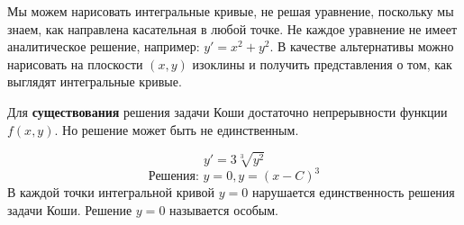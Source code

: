   \begin{ntc}
  Мы можем нарисовать интегральные кривые, не решая уравнение, поскольку мы знаем, как направлена касательная в любой точке.
  Не каждое уравнение не имеет аналитическое решение, например: $ y' = x^2 + y^2 $. В качестве альтернативы можно нарисовать на плоскости $(x, y)$ изоклины и получить представления о том, как выглядят интегральные кривые.
  \end{ntc}
  
  \begin{ntc}
  Для \textbf{существования} решения задачи Коши достаточно непрерывности функции $f(x, y)$. Но решение может быть не единственным.
  \end{ntc}
  
  \begin{xmp}
  $$ y' = 3\sqrt[3]{y^2} $$
  $$ \text{Решения: } y = 0, y = (x - C)^3 $$ В каждой точки интегральной кривой $y = 0$ нарушается единственность решения задачи Коши. Решение $y = 0$ называется особым. 
  \end{xmp}